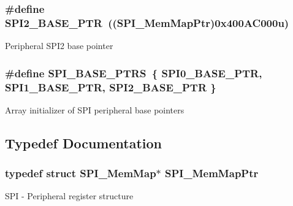 \subsubsection[{S\+P\+I2\+\_\+\+B\+A\+S\+E\+\_\+\+P\+T\+R}]{\setlength{\rightskip}{0pt plus 5cm}\#define S\+P\+I2\+\_\+\+B\+A\+S\+E\+\_\+\+P\+T\+R~(({\bf S\+P\+I\+\_\+\+Mem\+Map\+Ptr})0x400\+A\+C000u)}\label{group___s_p_i___peripheral_ga78714a4b750aa56fc56d1d223a560069}
Peripheral S\+P\+I2 base pointer \hypertarget{group___s_p_i___peripheral_ga3a16fecfe27c2052ab60e014be3f66f6}{}
\subsubsection[{S\+P\+I\+\_\+\+B\+A\+S\+E\+\_\+\+P\+T\+R\+S}]{\setlength{\rightskip}{0pt plus 5cm}\#define S\+P\+I\+\_\+\+B\+A\+S\+E\+\_\+\+P\+T\+R\+S~\{ {\bf S\+P\+I0\+\_\+\+B\+A\+S\+E\+\_\+\+P\+T\+R}, {\bf S\+P\+I1\+\_\+\+B\+A\+S\+E\+\_\+\+P\+T\+R}, {\bf S\+P\+I2\+\_\+\+B\+A\+S\+E\+\_\+\+P\+T\+R} \}}\label{group___s_p_i___peripheral_ga3a16fecfe27c2052ab60e014be3f66f6}
Array initializer of S\+P\+I peripheral base pointers 

\subsection{Typedef Documentation}
\hypertarget{group___s_p_i___peripheral_ga7e4e9921e4d56bdbb10a04e77743ff5e}{}
\subsubsection[{S\+P\+I\+\_\+\+Mem\+Map\+Ptr}]{\setlength{\rightskip}{0pt plus 5cm}typedef struct {\bf S\+P\+I\+\_\+\+Mem\+Map}$\ast$ {\bf S\+P\+I\+\_\+\+Mem\+Map\+Ptr}}\label{group___s_p_i___peripheral_ga7e4e9921e4d56bdbb10a04e77743ff5e}
S\+P\+I -\/ Peripheral register structure 